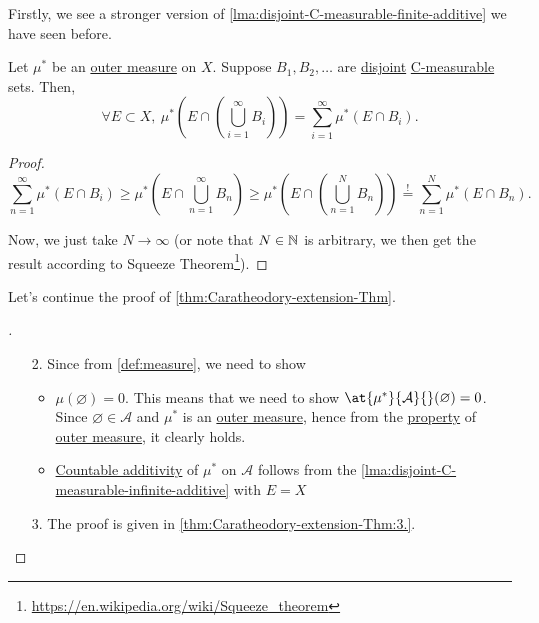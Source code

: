 Firstly, we see a stronger version of \autoref{lma:disjoint-C-measurable-finite-additive} we have seen before.
\begin{lemma}\label{lma:disjoint-C-measurable-infinite-additive}
	Let \(\mu^{*} \) be an \hyperref[def:outer-measure]{outer measure} on \(X\). Suppose \(B_1, B_2, \ldots\) are \underline{disjoint} \hyperref[def:C-measurable]{C-measurable} sets.
	Then,
	\[
		\forall E\subset X,\ \mu^{*} \left(E\cap \left(\bigcup\limits_{i=1}^{\infty} B_{i}\right)\right) = \sum\limits_{i=1}^{\infty} \mu^{*} \left(E\cap B_i\right).
	\]
\end{lemma}
\begin{proof}
	\[
		\sum\limits_{n=1}^{\infty} \mu^{*} (E\cap B_{i}) \geq \mu^{*} \left(E\cap \bigcup\limits_{n=1}^{\infty} B_{n}\right) \geq\mu^{*} \left(E\cap \left(\bigcup\limits_{n=1}^{N} B_{n}\right)\right) \overset{\hyperref[lma:disjoint-C-measurable-finite-additive]{!}}{=} \sum\limits_{n=1}^{N} \mu^{*} \left(E\cap B_n\right).
	\]

	Now, we just take \(N\to \infty \) (or note that \(N\in\mathbb{\MakeUppercase{N}} \) is arbitrary, we then get the result according to
	Squeeze Theorem\footnote{\url{https://en.wikipedia.org/wiki/Squeeze_theorem}}).
\end{proof}
Let's continue the proof of \autoref{thm:Caratheodory-extension-Thm}.
\begin{proof}[\unskip\nopunct]\label{pf:Caratheodory-extension-Thm-cont}
	\begin{enumerate}
		\item[2.] Since from \autoref{def:measure}, we need to show
			\begin{itemize}
				\item \(\mu (\varnothing ) = 0\). This means that we need to show \(\at{\mu^{*} }{\mathcal{A}}{}(\varnothing ) = 0\). Since \(\varnothing \in \mathcal{A} \) and \(\mu^{*}\) is
				      an \hyperref[def:outer-measure]{outer measure}, hence from the \hyperref[def:outer-measure-empty-measure]{property} of \hyperref[def:outer-measure]{outer measure}, it clearly holds.
				\item \hyperref[def:measure-countable-additivity]{Countable additivity} of \(\mu^{*} \) on \(\mathcal{A}\) follows from the \autoref{lma:disjoint-C-measurable-infinite-additive} with \(E = X\)
			\end{itemize}
		\item[3.] The proof is given in \autoref{thm:Caratheodory-extension-Thm:3.}.
	\end{enumerate}
\end{proof}

